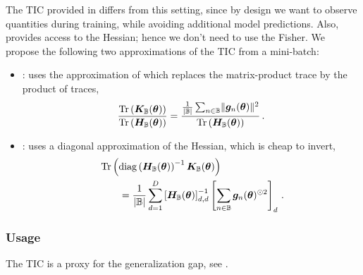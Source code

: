 The TIC provided in \cockpit differs from this setting, since by design we want
to observe quantities during training, while avoiding additional model
predictions. Also, \backpack provides access to the Hessian; hence we don't need
to use the Fisher. We propose the following two approximations of the TIC from a
mini-batch:
\begin{itemize}
\item {}: uses the approximation of \citet{thomas2020interplay} which
  replaces the matrix-product trace by the product of traces,
  \begin{align}
    \label{cockpit::eq:tic-trace-feature-table}
    \frac{
    \operatorname{Tr}\left(
    {\bm{K}}_{{\mathbb{B}}}({\bm{\theta}})
    \right)
    }{
    \operatorname{Tr}\left(
    {\bm{H}}_{{\mathbb{B}}}({\bm{\theta}})
    \right)
    }
    =
    \frac{
    \frac{1}{|{\mathbb{B}}|}
    \sum_{n\in{\mathbb{B}}}
    \lVert
    {\bm{g}}_{n}({\bm{\theta}})
    \rVert^2
    }{
    \operatorname{Tr}\left(
    {\bm{H}}_{{\mathbb{B}}}({\bm{\theta}})
    \right)
    }\,.
  \end{align}
\item {}: uses a diagonal approximation of the Hessian, which
  is cheap to invert,
  \begin{align}
    \label{cockpit::eq:tic-diag-feature-table}
    \begin{split}
      &\operatorname{Tr}\left(
        \operatorname{diag}\left(
        {\bm{H}}_{{\mathbb{B}}}({\bm{\theta}})
        \right)^{-1}
        {\bm{K}}_{{\mathbb{B}}}({\bm{\theta}})
        \right)
      \\
      &\qquad
        =
        \frac{1}{|{\mathbb{B}}|}
        \sum_{d=1}^D
        \left[
        {\bm{H}}_{\mathbb{B}}({\bm{\theta}})
        \right]_{d,d}^{-1}
        \left[
        \sum_{n\in{\mathbb{B}}}
        {\bm{g}}_{n}({\bm{\theta}})^{\odot 2}
        \right]_{d}\,.
    \end{split}
  \end{align}
\end{itemize}

\subsubsection{Usage}

The TIC is a proxy for the generalization gap, see \citet{thomas2020interplay}.

